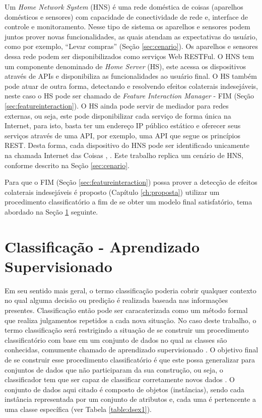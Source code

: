 Um \textit{Home Network System} (HNS) é uma rede doméstica de coisas (aparelhos domésticos e sensores) com capacidade de conectividade de rede e, interface de controle e monitoramento. Nesse tipo de sistema os aparelhos e sensores podem juntos prover novas funcionalidades, as quais atendam as expectativas do usuário, como por exemplo, ``Levar compras'' (Seção \ref{sec:cenario}). Os aparelhos e sensores dessa rede podem ser disponibilizados como serviços Web RESTFul. O HNS tem um componente denominado de \textit{Home Server} (HS), este acessa os dispositivos através de APIs e disponibiliza as funcionalidades ao usuário final. O HS também pode atuar de outra forma, detectando e resolvendo efeitos colaterais indesejáveis, neste caso o HS pode ser chamado de \textit{Feature Interaction Manager} - FIM (Seção \ref{sec:featureinteraction}). O HS ainda pode servir de mediador para redes externas, ou seja, este pode disponibilizar cada serviço de forma única na Internet, para isto, basta ter um endereço IP público estático e oferecer seus serviços através de uma API, por exemplo, uma API que segue os princípios REST. Desta forma, cada dispositivo do HNS pode ser identificado unicamente na chamada Internet das Coisas \cite{Nakamura:2009}, \cite{Ikegami:2013}. Este trabalho replica um cenário de HNS, conforme descrito na Seção \ref{sec:cenario}.

Para que o FIM (Seção \ref{sec:featureinteraction}) possa prover a detecção de efeitos colaterais indesejáveis é proposto (Capítulo \ref{ch:proposta}) utilizar um procedimento classificatório a fim de se obter um modelo final satisfatório, tema abordado na Seção \ref{sec:classificacao} seguinte.

\section{Classificação - Aprendizado Supervisionado}
\label{sec:classificacao}
Em seu sentido mais geral, o termo classificação poderia cobrir qualquer contexto no qual alguma decisão ou predição é realizada baseada nas informações presentes. Classificação então pode ser caracaterizada como um método formal que realiza julgamentos repetidos a cada nova situação. No caso deste trabalho, o termo classificação será restrigindo a situação de se construir um procedimento classificatório com base em um conjunto de dados no qual as classes são conhecidas, comumente chamado de aprendizado supervisionado \cite{Michie:1994}. O objetivo final de se construir esse procedimento classificatório é que este possa generalizar para conjuntos de dados que não participaram da sua construção, ou seja, o classificador tem que ser capaz de classificar corretamente novos dados \cite{Kotsiantis:2007}. O conjunto de dados aqui citado é composto de objetos (instâncias), sendo cada instância representada por um conjunto de atributos e, cada uma é pertencente a uma classe específica (ver Tabela \ref{table:dsex1}).

